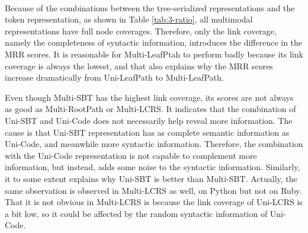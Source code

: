 \documentclass[conference]{IEEEtran}
\begin{document}
\begin{table}[thb]
\centering
\caption{Coverage Ratios of Multimodal Representations}
~\\
\label{tab:3-ratio}
\end{table}
 
Because of the combinations between the tree-serialized representations and the token representation, as shown in Table \ref{tab:3-ratio}, all multimodal representations have full node coverages. Therefore, only the link coverage, namely the completeness of syntactic information, introduces the difference in the MRR scores. It is reasonable for Multi-LeafPtah to perform badly because its link coverage is always the lowest, and that also explains why the MRR scores increase dramatically from Uni-LeafPath to Multi-LeafPath.

Even though Multi-SBT has the highest link coverage, its scores are not always as good as Multi-RootPath or Multi-LCRS. It indicates that the combination of Uni-SBT and Uni-Code does not necessarily help reveal more information. The cause is that Uni-SBT representation has as complete semantic information as Uni-Code, and meanwhile more syntactic information. Therefore, the combination with the Uni-Code representation is not capable to complement more information, but instead, adds some noise to the syntactic information. Similarly, it to some extent explains why Uni-SBT is better than Multi-SBT. Actually, the same observation is observed in Multi-LCRS as well, on Python but not on Ruby. That it is not obvious in Multi-LCRS is because the link coverage of Uni-LCRS is a bit low, so it could be affected by the random syntactic information of Uni-Code.
\end{document}
